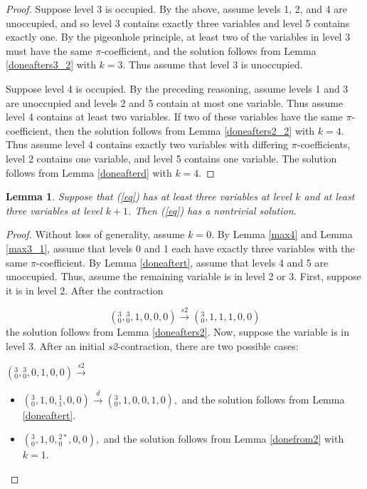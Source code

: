 \documentclass[draft]{publmathdeb}
\newtheorem{lemma}{Lemma}
\begin{document}
\begin{proof}
Suppose level 3 is occupied.  By the above, assume levels 1, 2, and 4 are unoccupied, and so level 3 contains exactly three variables and level 5 contains exactly one.  By the pigeonhole principle, at least two of the variables in level 3 must have the same $\pi$-coefficient, and the solution follows from Lemma \ref{doneafters3_2} with $k=3$.  Thus assume that level 3 is unoccupied.

Suppose level 4 is occupied.  By the preceding reasoning, assume levels 1 and 3 are unoccupied and levels 2 and 5 contain at most one variable.  Thus assume level 4 contains at least two variables.  If two of these variables have the same $\pi$-coefficient, then the solution follows from Lemma \ref{doneafters2_2} with $k=4$.  Thus assume level 4 contains exactly two variables with differing $\pi$-coefficients, level 2 contains one variable, and level 5 contains one variable.  The solution follows from Lemma \ref{doneafterd} with $k=4$.
\end{proof}

\begin{lemma}\label{33}
Suppose that (\ref{eq}) has at least three variables at level $k$ and at least three variables at level $k+1$.  Then (\ref{eq}) has a nontrivial solution.
\end{lemma}
\begin{proof}
Without loss of generality, assume $k=0$.  By Lemma \ref{max4} and Lemma \ref{max3_1}, assume that levels 0 and 1 each have exactly three variables with the same $\pi$-coefficient.  By Lemma \ref{doneaftert}, assume that levels 4 and 5 are unoccupied.  Thus, assume the remaining variable is in level 2 or 3.  First, suppose it is in level 2.  After the contraction

$$({}^{3}_{0},{}^{3}_{0},1,0,0,0) \xrightarrow{s2} ({}^{3}_{0},1,1,1,0,0)$$
the solution follows from Lemma \ref{doneafters2}.  Now, suppose the variable is in level 3.  After an initial \textit{s2}-contraction, there are two possible cases:

$({}^{3}_{0},{}^{3}_{0},0,1,0,0) \xrightarrow{s2}$

\begin{itemize}
    \item $({}^{3}_{0},1,0,{}^{1}_{1},0,0) \xrightarrow{d} ({}^{3}_{0},1,0,0,1,0),$
    and the solution follows from Lemma \ref{doneaftert}.
    \item $({}^{3}_{0},1,0,{}^{2*}_{0},0,0),$
    and the solution follows from Lemma \ref{donefrom2} with $k=1$.
\end{itemize}

\end{proof}
\end{document}
